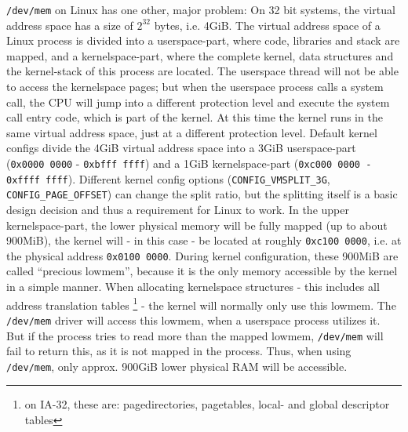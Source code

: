 
\texttt{/dev/mem} on Linux has one other, major problem:
\label{kerneluserdivision} On 32 bit systems, the virtual address space has a
size of $2^{32}$ bytes, i.e\@. 4GiB. The virtual address space of a Linux
process is divided into a userspace-part, where code, libraries and stack are
mapped, and a kernelspace-part, where the complete kernel, data structures and
the kernel-stack of this process are located. The userspace thread will not be
able to access the kernelspace pages; but when the userspace process calls a
system call, the CPU will jump into a different protection level and execute the
system call entry code, which is part of the kernel. At this time the kernel
runs in the same virtual address space, just at a different protection level.
Default kernel configs divide the 4GiB virtual address space into a 3GiB
userspace-part (\texttt{0x0000~0000} - \texttt{0xbfff~ffff}) and a 1GiB
kernelspace-part (\texttt{0xc000~0000 - 0xffff~ffff}). Different kernel config
options (\texttt{CONFIG\_VMSPLIT\_3G}, \texttt{CONFIG\_PAGE\_OFFSET}) can change
the split ratio, but the splitting itself is a basic design decision and thus a
requirement for Linux to work. In the upper kernelspace-part, the lower physical
memory will be fully mapped (up to about 900MiB), the kernel will - in this case
- be located at roughly \texttt{0xc100~0000}, i.e\@. at the physical address
\texttt{0x0100~0000}. During kernel configuration, these 900MiB are called
``precious lowmem'', because it is the only memory accessible by the kernel in a
simple manner. When allocating kernelspace structures - this includes all
address translation tables \footnote{on IA-32, these are: pagedirectories,
pagetables, local- and global descriptor tables} \label{linuxATTinlowmem} - the
kernel will normally only use this lowmem. The \texttt{/dev/mem} driver will
access this lowmem, when a userspace process utilizes it. But if the process
tries to read more than the mapped lowmem, \texttt{/dev/mem} will fail to return
this, as it is not mapped in the process. Thus, when using \texttt{/dev/mem},
only approx\@. 900GiB lower physical RAM will be accessible.

